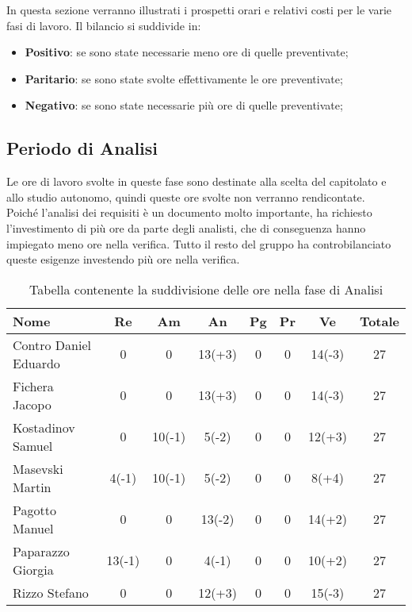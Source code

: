 \documentclass[../piano_di_progetto.tex]{subfiles}
\begin{document}
In questa sezione verranno illustrati i prospetti orari e relativi costi per le varie fasi di lavoro. Il bilancio si suddivide in:
\begin{itemize}
\item \textbf{Positivo}: se sono state necessarie meno ore di quelle preventivate;
\item \textbf{Paritario}: se sono state svolte effettivamente le ore preventivate;
\item \textbf{Negativo}: se sono state necessarie più ore di quelle preventivate;
\end{itemize}

\subsection{ Periodo di Analisi}%
\label{sub:cons_analisi}
Le ore di lavoro svolte in queste fase sono destinate alla scelta del capitolato e allo studio autonomo, quindi queste ore svolte non verranno rendicontate.\\
Poiché l'analisi dei requisiti è un documento molto importante, ha richiesto l'investimento di più ore da parte degli analisti, che di conseguenza hanno impiegato meno ore nella verifica. 
Tutto il resto del gruppo ha controbilanciato queste esigenze investendo più ore nella verifica.

\begin{table}[!ht]
	\centering
	\begin{tabular}{|l|c|c|c|c|c|c|c|}
	\hline
	\rowcolor{lightgray}
	\textbf{Nome} & \textbf{Re} & \textbf{Am} & \textbf{An} & \textbf{Pg}  & \textbf{Pr}   & \textbf{Ve} & \textbf{Totale}\\
	\hline
		Contro Daniel Eduardo & 0 & 0 & 13(+3) & 0 & 0 & 14(-3) & 27 \\
	\hline
		Fichera Jacopo & 0 & 0 & 13(+3) & 0 & 0 & 14(-3) & 27 \\
	\hline
		Kostadinov Samuel & 0 & 10(-1) & 5(-2) & 0 & 0 & 12(+3) & 27 \\			
	\hline
		Masevski Martin & 4(-1) & 10(-1) & 5(-2) & 0 & 0 & 8(+4) & 27 \\
	\hline
		Pagotto Manuel & 0 & 0 & 13(-2) & 0 & 0 & 14(+2) & 27 \\			
	\hline
		Paparazzo Giorgia & 13(-1) & 0 & 4(-1) & 0 & 0 & 10(+2) & 27 \\
	\hline
		Rizzo Stefano & 0 & 0 & 12(+3) & 0 & 0 & 15(-3) & 27 \\
	\hline	
	\end{tabular}
	\caption{Tabella contenente la suddivisione delle ore nella fase di Analisi}
\end{table}
\end{document}
